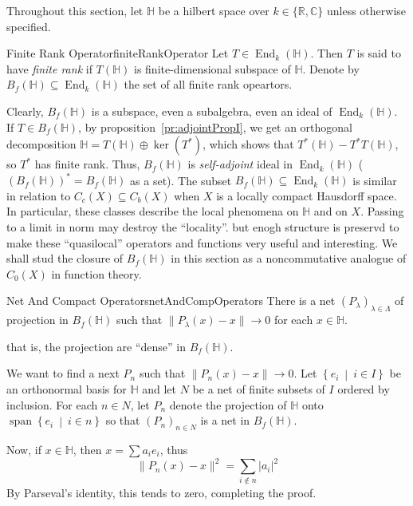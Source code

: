 \documentclass[oneside]{book}
\newcommand{\R}{\mathbb{R}}
\newcommand{\C}{\mathbb{C}}
\renewcommand{\H}{\mathbb{H}}
\newcommand{\sse}{\subseteq}
\newcommand{\End}{\operatorname{End}}
\newcommand{\Span}{\operatorname{span}}
\newcommand{\set}[2]{\left\{#1 \ \middle|\ #2\right\}}
\begin{document}
Throughout this section, let $\H$ be a hilbert space over $k \in \{\R, \C\}$ unless otherwise specified.

\begin{defn}{Finite Rank Operator}{finiteRankOperator}
	Let $T \in \End_k(\H)$. Then $T$ is said to have \emph{finite rank} if $T(\H)$ is finite-dimensional
	subspace of $\H$. Denote by $B_f(\H) \sse \End_k(\H)$ the set of all finite rank opeartors.
\end{defn}

Clearly, $B_f(\H)$ is a subspace, even a subalgebra, even an ideal of $\End_k(\H)$. If $T \in B_f(\H)$, by
proposition~\ref{pr:adjointPropI}, we get an orthogonal decomposition $\H = T(\H) \oplus \ker(T^*)$, which
shows that $T^*(\H) - T^*T(\H)$, so $T^*$ has finite rank. Thus, $B_f(\H)$ is \emph{self-adjoint} ideal in $\End_k(\H)$
($(B_f(\H))^* = B_f(\H)$ as a set). The subset $B_f(\H)\sse \End_k(\H)$ is similar in relation to $C_c(X) \sse
C_b(X)$ when $X$ is a locally compact Hausdorff space. In particular, these classes describe the local phenomena
on $\H$ and on $X$. Passing to a limit in norm may destroy the ``locality''. but enogh structure is preservd to make
these ``quasilocal'' operators and functions very useful and interesting. We shall stud the closure of $B_f(\H)$ in
this section as a noncommutative analogue of $C_0(X)$ in function theory.


\begin{lem}{Net And Compact Operators}{netAndCompOperators}
	There is a net $(P_\lambda)_{\lambda \in \Lambda}$ of projection in $B_f(\H)$ such that $\|P_\lambda(x)
	- x\| \to 0$ for each $x \in \H$.
\end{lem}

that is, the projection are ``dense'' in $B_f(\H)$.

\begin{Proof}
	We want to find a next $P_n$ such that $\|P_n(x) - x\| \to 0$. Let $\set{e_i}{i \in I}$ be an orthonormal basis
	for $\H$ and let $N$ be a net of finite subsets of $I$ ordered by inclusion. For each $n \in N$, let $P_n$
	denote the projection of $\H$ onto $\Span\set{e_i}{i \in n}$ so that $(P_n)_{n \in N}$ is a net in $B_f(\H)$.

	Now, if $x \in \H$, then $x = \sum a_ie_i$, thus
	\[
		\|P_n(x) - x\|^2 = \sum_{i \notin n} |a_i|^2
	\]
	By Parseval's identity, this tends to zero, completing the proof.
\end{Proof}
\end{document}
